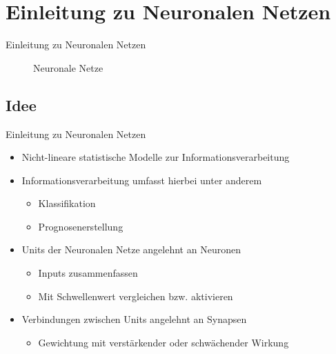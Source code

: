 \documentclass{beamer}
\begin{document}
\section{Einleitung zu Neuronalen Netzen}
\begin{frame}[t]{Einleitung zu Neuronalen Netzen}\vspace{70pt}
\begin{figure}
\center
\Huge{Neuronale Netze}
\end{figure}
\end{frame}
\subsection{Idee}
\begin{frame}[t]{Einleitung zu Neuronalen Netzen}\vspace{4pt}
\begin{center}
\begin{itemize}
\large\item[] Nicht-lineare statistische Modelle zur Informationsverarbeitung
\large\item[] Informationsverarbeitung umfasst hierbei unter anderem
\begin{itemize}
\item[] Klassifikation
\item[] Prognosenerstellung
\end{itemize}
\large\item[] Units der Neuronalen Netze angelehnt an Neuronen
\begin{itemize}
\item[] Inputs zusammenfassen
\item[] Mit Schwellenwert vergleichen bzw. aktivieren
\end{itemize}
\large\item[] Verbindungen zwischen Units angelehnt an Synapsen
\begin{itemize}
\item[] Gewichtung mit verstärkender oder schwächender Wirkung
\end{itemize}
\end{itemize}
\end{center}
\end{frame}
\end{document}
